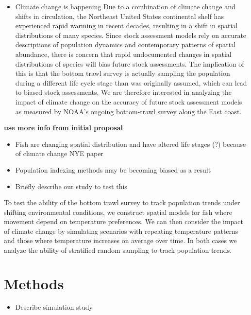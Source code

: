 \documentclass[
  12pt,
]{article}
\providecommand{\tightlist}{%
  \setlength{\itemsep}{0pt}\setlength{\parskip}{0pt}}
\begin{document}
\begin{itemize}
\tightlist
\item
  Climate change is happening
  Due to a combination of climate change and shifts in circulation, the Northeast United States continental shelf has experienced rapid warming in recent decades, resulting in a shift in spatial distributions of many species. Since stock assessment models rely on accurate descriptions of population dynamics and contemporary patterns of spatial abundance, there is concern that rapid undocumented changes in spatial distributions of species will bias future stock assessments. The implication of this is that the bottom trawl survey is actually sampling the population during a different life cycle stage than was originally assumed, which can lead to biased stock assessments. We are therefore interested in analyzing the impact of climate change on the accuracy of future stock assessment models as measured by NOAA's ongoing bottom-trawl survey along the East coast.
\end{itemize}

\textbf{use more info from initial proposal}

\begin{itemize}
\item
  Fish are changing spatial distribution and have altered life stages (?) because of climate change
  NYE paper
\item
  Population indexing methods may be becoming biased as a result
\item
  Briefly describe our study to test this
\end{itemize}

To test the ability of the bottom trawl survey to track population trends under shifting environmental conditions, we construct spatial models for fish where movement depend on temperature preferences. We can then consider the impact of climate change by simulating scenarios with repeating temperature patterns and those where temperature increases on average over time. In both cases we analyze the ability of stratified random sampling to track population trends.

\section{Methods}

\begin{itemize}
\tightlist
\item
  Describe simulation study
\end{itemize}
\end{document}
